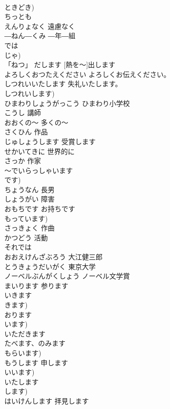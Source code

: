 \documentclass[8pt]{extreport}
\begin{document}
\begin{CJK}{UTF8}{min}
\\	ときどき)		
\\	ちっとも			
\\	えんりょなく	遠慮なく	
\\	―ねん―くみ	―年―組	
\\	では			
\\	じゃ)		
\\	「ねつ」 だします	[熱を～]出します	
\\	よろしくおつたえください	よろしくお伝えください。	
\\	しつれいいたします	失礼いたします。	
\\	しつれいします)		
\\	ひまわりしょうがっこう	ひまわり小学校	
\\	こうし	講師	
\\	おおくの～	多くの～	
\\	さくひん	作品	
\\	じゅしょうします	受賞します	
\\	せかいてきに	世界的に	
\\	さっか	作家	
\\	～でいらっしゃいます			
\\	です)		
\\	ちょうなん	長男	
\\	しょうがい	障害	
\\	おもちです	お持ちです	
\\	もっています)		
\\	さっきょく	作曲	
\\	かつどう	活動	
\\	それでは			
\\	おおえけんざぶろう	大江健三郎	
\\	とうきょうだいがく	東京大学	
\\	ノーベルぶんがくしょう	ノーベル文学賞	
\\	まいります	参ります	
\\	いきます 
\\	きます)		
\\	おります			
\\	います)		
\\	いただきます			
\\	たべます、のみます　
\\	もらいます)		
\\	もうします	申します	
\\	いいます)		
\\	いたします			
\\	します)		
\\	はいけんします	拝見します	

\end{CJK}
\end{document}
